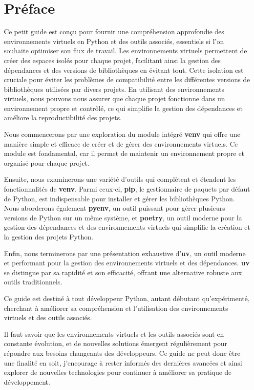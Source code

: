 \section*{Préface}
Ce petit guide est conçu pour fournir une compréhension approfondie des environnements virtuels en Python et des outils associés, essentiels si l'on souhaite optimiser son flux de travail. Les environnements virtuels permettent de créer des espaces isolés pour chaque projet, facilitant ainsi la gestion des dépendances et des versions de bibliothèques en évitant tout. Cette isolation est cruciale pour éviter les problèmes de compatibilité entre les différentes versions de bibliothèques utilisées par divers projets. En utilisant des environnements virtuels, nous pouvons nous assurer que chaque projet fonctionne dans un environnement propre et contrôlé, ce qui simplifie la gestion des dépendances et améliore la reproductibilité des projets.

Nous commencerons par une exploration du module intégré \textbf{venv} qui offre une manière simple et efficace de créer et de gérer des environnements virtuels. Ce module est fondamental, car il permet de maintenir un environnement propre et organisé pour chaque projet.

Ensuite, nous examinerons une variété d'outils qui complètent et étendent les fonctionnalités de \textbf{venv}. Parmi ceux-ci, \textbf{pip}, le gestionnaire de paquets par défaut de Python, est indispensable pour installer et gérer les bibliothèques Python. Nous aborderons également \textbf{pyenv}, un outil puissant pour gérer plusieurs versions de Python sur un même système, et \textbf{poetry}, un outil moderne pour la gestion des dépendances et des environnements virtuels qui simplifie la création et la gestion des projets Python.

Enfin, nous terminerons par une présentation exhaustive d'\textbf{uv}, un outil moderne et performant pour la gestion des environnements virtuels et des dépendances. \textbf{uv} se distingue par sa rapidité et son efficacité, offrant une alternative robuste aux outils traditionnels.

Ce guide est destiné à tout développeur Python, autant débutant qu'expérimenté, cherchant à améliorer sa compréhension et l'utilisation des environnements virtuels et des outils associés. 

Il faut savoir que les environnements virtuels et les outils associés sont en constante évolution, et de nouvelles solutions émergent régulièrement pour répondre aux besoins changeants des développeurs. Ce guide ne peut donc être une finalité en soit, j'encourage à rester informés des dernières avancées et ainsi explorer de nouvelles technologies pour continuer à améliorer sa pratique de développement.

